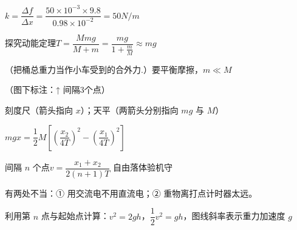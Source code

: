 $k=\dfrac{\Delta f}{\Delta x}=\dfrac{50\times10^{-3}\times9.8}{0.98\times10^{-2}}=50\unit{N/m}$%

探究动能定理\quad $T=\dfrac{Mmg}{M+m}=\dfrac{mg}{1+\frac{m}{M}}\approx mg$

（把桶总重力当作小车受到的合外力.）\quad 要平衡摩擦，$m\ll M$


（图下标注：↑ 间隔3个点）

刻度尺（箭头指向 $x$）；天平（两箭头分别指向 $mg$ 与 $M$）

$mgx=\dfrac12M\left[\left(\dfrac{x_2}{4T}\right)^2-\left(\dfrac{x_1}{4T}\right)^2\right]$

间隔 $n$ 个点\quad $v=\dfrac{x_1+x_2}{2(n+1)T}$
自由落体验机守


有两处不当：① 用交流电不用直流电；② 重物离打点计时器太远。

利用第 $n$ 点与起始点计算：$v^2=2gh$，$\dfrac12v^2=gh$，图线斜率表示重力加速度 $g$
